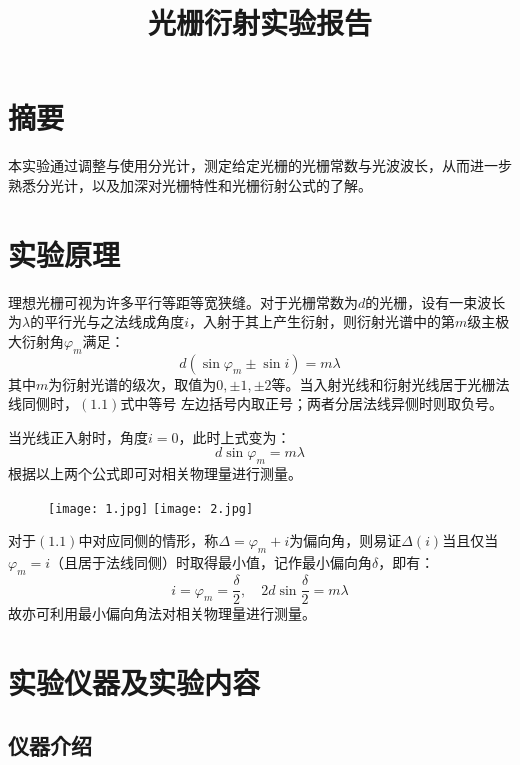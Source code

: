 \documentclass{ctexart}
\title{光栅衍射实验报告}
\begin{document}
\maketitle

\section*{摘要}
本实验通过调整与使用分光计，测定给定光栅的光栅常数与光波波长，从而进一步熟悉分光计，以及加深对光栅特性和光栅衍射公式的了解。

\section{实验原理}

理想光栅可视为许多平行等距等宽狭缝。对于光栅常数为$d$的光栅，设有一束波长为$\lambda$的平行光与之法线成角度$i$，入射于其上产生衍射，则衍射光谱中的第$m$级主极大衍射角$\varphi_m$满足：
\begin{equation}
  d(\sin\varphi_m\pm \sin i)=m\lambda
\end{equation}
其中$m$为衍射光谱的级次，取值为$0,\pm 1,\pm 2$等。当入射光线和衍射光线居于光栅法线同侧时，$(1.1)$式中等号
左边括号内取正号；两者分居法线异侧时则取负号。

当光线正入射时，角度$i=0$，此时上式变为：
\begin{equation}
  d\sin\varphi_m=m\lambda
\end{equation}
根据以上两个公式即可对相关物理量进行测量。

\begin{figure}[h]                                           
  \texttt{[image: 1.jpg]}
  \qquad
  \texttt{[image: 2.jpg]}
\end{figure}

对于$(1.1)$中对应同侧的情形，称$\Delta=\varphi_m+i$为偏向角，则易证$\Delta(i)$当且仅当$\varphi_m=i$（且居于法线同侧）时取得最小值，记作最小偏向角$\delta$，即有：
\begin{equation}
  i=\varphi_m=\displaystyle\frac{\delta}{2}, \quad 2d\sin\displaystyle\frac{\delta}{2}=m\lambda
\end{equation}
故亦可利用最小偏向角法对相关物理量进行测量。


\section{实验仪器及实验内容}

\subsection{仪器介绍}
\end{document}
